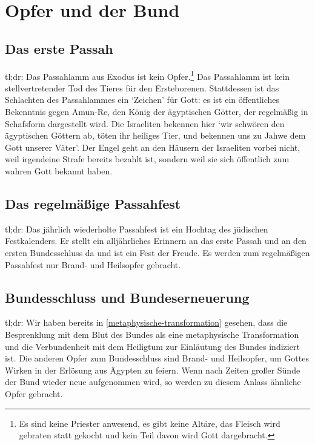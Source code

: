 

\chapter{Opfer und der Bund}
\section{Das erste Passah}
tl;dr:
Das Passahlamm aus Exodus ist kein Opfer.\footnote{
Es sind keine Priester anwesend, es gibt keine Altäre, das Fleisch wird gebraten statt gekocht und kein Teil davon wird Gott dargebracht.}
Das Passahlamm ist kein stellvertretender Tod des Tieres für den Ersteborenen.
Stattdessen ist das Schlachten des Passahlammes ein `Zeichen' für Gott: es ist ein öffentliches Bekenntnis gegen Amun-Re, den König der ägyptischen Götter, der regelmäßig in Schafsform dargestellt wird.
Die Israeliten bekennen hier `wir schwören den ägyptischen Göttern ab, töten ihr heiliges Tier, und bekennen uns zu Jahwe dem Gott unserer Väter'.
Der Engel geht an den Häusern der Israeliten vorbei nicht, weil irgendeine Strafe bereits bezahlt ist, sondern weil sie sich öffentlich zum wahren Gott bekannt haben.

\section{Das regelmäßige Passahfest}
tl;dr:
Das jährlich wiederholte Passahfest ist ein Hochtag des jüdischen Festkalenders.
Er stellt ein alljährliches Erinnern an das erste Passah und an den ersten Bundesschluss da und ist ein Fest der Freude.
Es werden zum regelmäßigen Passahfest nur Brand- und Heilsopfer gebracht.

\section{Bundesschluss und Bundeserneuerung}
tl;dr:
Wir haben bereits in \ref{metaphysische-transformation} gesehen, dass die Besprenklung mit dem Blut des Bundes als eine metaphysische Transformation und die Verbundenheit mit
dem Heiligtum zur Einläutung des Bundes indiziert ist.
Die anderen Opfer zum Bundesschluss sind Brand- und Heilsopfer, um Gottes Wirken in der Erlösung aus Ägypten zu feiern.
Wenn nach Zeiten großer Sünde der Bund wieder neue aufgenommen wird, so werden zu diesem Anlass ähnliche Opfer gebracht.
